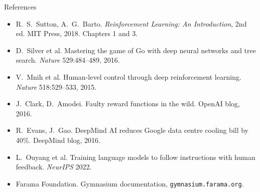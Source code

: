 \documentclass[aspectratio=169,10pt]{beamer}
\begin{document}
\begin{frame}[plain]
\begin{columns}[T]
  \end{columns}
\end{frame}

\begin{frame}{References}
  \small
  \begin{itemize}[<1->]
    \item R.\ S.\ Sutton, A.\ G.\ Barto. \emph{Reinforcement Learning: An Introduction}, 2nd ed. MIT Press, 2018. Chapters 1 and 3.
    \item D.\ Silver et al. Mastering the game of Go with deep neural networks and tree search. \emph{Nature} 529:484--489, 2016.
    \item V.\ Mnih et al. Human-level control through deep reinforcement learning. \emph{Nature} 518:529--533, 2015.
    \item J.\ Clark, D.\ Amodei. Faulty reward functions in the wild. OpenAI blog, 2016.
    \item R.\ Evans, J.\ Gao. DeepMind AI reduces Google data centre cooling bill by 40\%. DeepMind blog, 2016.
    \item L.\ Ouyang et al. Training language models to follow instructions with human feedback. \emph{NeurIPS} 2022.
    \item Farama Foundation. Gymnasium documentation, \texttt{gymnasium.farama.org}.
  \end{itemize}
\end{frame}
\end{document}

